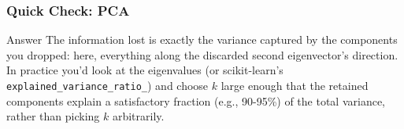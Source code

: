 \begin{frame}[fragile]\frametitle{Quick Check: PCA}
\begin{block}{Answer}
The information lost is exactly the variance captured by the components you dropped: here,
everything along the discarded second eigenvector's direction. In practice you'd look at the
eigenvalues (or scikit-learn's \texttt{explained\_variance\_ratio\_}) and choose $k$ large
enough that the retained components explain a satisfactory fraction (e.g., 90-95\%) of the
total variance, rather than picking $k$ arbitrarily.
\end{block}
\end{frame}

%
